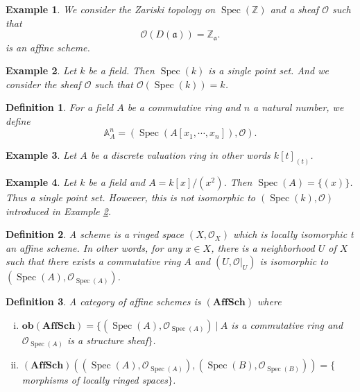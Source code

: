 \documentclass{article}
\newtheorem{definition}{Definition}[section]
\newtheorem{example}{Example}[section]
\numberwithin{equation}{section}
\DeclareMathOperator{\Spec}{Spec}
\begin{document}
\begin{example}
We consider the Zariski topology on $\Spec(\mathbb{Z})$ and a sheaf $\mathcal{O}$ such that
\begin{equation*}
\mathcal{O}(D(\mathfrak{a})) = \mathbb{Z}_{\mathfrak{a}}.
\end{equation*}
is an affine scheme.
\end{example}

\begin{example}
Let $k$ be a field. Then $\Spec(k)$ is  a single point set. And we consider the sheaf $\mathcal{O}$ such that $\mathcal{O}(\Spec(k))=k$. 
\label{field_spec}
\end{example}

\begin{definition}For a field $A$ be a commutative ring and $n$ a natural number, we define
\begin{equation*}
\mathbb{A}^n_A=(\Spec(A[x_1,\cdots,x_n]),\mathcal{O}).
\end{equation*}
\end{definition}

\begin{example}
Let $A$ be a discrete valuation ring in other words $k[t]_{(t)}$. 
\end{example}

\begin{example}
Let $k$ be a field and $A=k[x]/(x^2)$. Then $\Spec(A)=\{(x)\}$. Thus a single point set. However, this is not isomorphic to $(\Spec(k),\mathcal{O})$ introduced in Example \ref{field_spec}.
\end{example}

\begin{definition}
A scheme is a ringed space $(X,\mathcal{O}_X)$ which is locally isomorphic t an affine scheme. In other words, for any $x\in X$, there is a neighborhood $U$ of $X$ such that there exists a commutative ring $A$ and $(U,\mathcal{O}|_U)$ is isomorphic to $(\Spec(A), \mathcal{O}_{\Spec(A)})$.
\end{definition}

\begin{definition}
A category of affine schemes is $(\mathbf{AffSch})$ where
\begin{enumerate}[i).]
\item $\mathbf{ob}(\mathbf{AffSch}) = \{(\Spec(A),\mathcal{O}_{\Spec(A)})\:|\: A$ is a commutative ring and $\mathcal{O}_{\Spec(A)}$ is a structure sheaf$\}$.
\item $(\mathbf{AffSch})((\Spec(A),\mathcal{O}_{\Spec(A)}),(\Spec(B),\mathcal{O}_{\Spec(B)})) =\{$ morphisms of locally ringed spaces$\}$.
\end{enumerate}
\end{definition}
\end{document}
